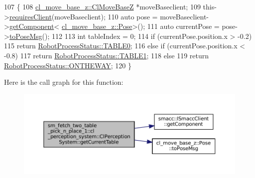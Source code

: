 \begin{DoxyCode}
107     \{
108         \hyperlink{classcl__move__base__z_1_1ClMoveBaseZ}{cl\_move\_base\_z::ClMoveBaseZ} *moveBaseclient;
109         this->\hyperlink{classsmacc_1_1ISmaccClient_a7a9990a2f3e35d547671188d69fee520}{requiresClient}(moveBaseclient);
110         \textcolor{keyword}{auto} pose = moveBaseclient->\hyperlink{classsmacc_1_1ISmaccClient_adef78db601749ca63c19e74a27cb88cc}{getComponent}<
      \hyperlink{classcl__move__base__z_1_1Pose}{cl\_move\_base\_z::Pose}>();
111         \textcolor{keyword}{auto} currentPose = pose->\hyperlink{classcl__move__base__z_1_1Pose_a9faf8c6b437ff6b19c8bddd692908dca}{toPoseMsg}();
112 
113         \textcolor{keywordtype}{int} tableIndex = 0;
114         \textcolor{keywordflow}{if} (currentPose.position.x > -0.2)
115             \textcolor{keywordflow}{return} \hyperlink{namespacesm__fetch__two__table__pick__n__place__1_1_1cl__perception__system_a8bbef1f1cfae124eaec70ac53eede699a1fd65c0ced0ead229bf6dd6a59067a4f}{RobotProcessStatus::TABLE0};
116         \textcolor{keywordflow}{else} \textcolor{keywordflow}{if} (currentPose.position.x < -0.8)
117             \textcolor{keywordflow}{return} \hyperlink{namespacesm__fetch__two__table__pick__n__place__1_1_1cl__perception__system_a8bbef1f1cfae124eaec70ac53eede699a5b22e42e5d94a94037a4486a4976c49d}{RobotProcessStatus::TABLE1};
118         \textcolor{keywordflow}{else}
119             \textcolor{keywordflow}{return} \hyperlink{namespacesm__fetch__two__table__pick__n__place__1_1_1cl__perception__system_a8bbef1f1cfae124eaec70ac53eede699a92f7ea3097b3fdb1b7a25669cfc1b8bd}{RobotProcessStatus::ONTHEWAY};
120     \}
\end{DoxyCode}
Here is the call graph for this function\+:
\nopagebreak
\begin{figure}[H]
\begin{center}
\leavevmode
\includegraphics[width=350pt]{classsm__fetch__two__table__pick__n__place__1_1_1cl__perception__system_1_1ClPerceptionSystem_ad9c1b82e644fdbfbfc2d808523a1f330_cgraph}
\end{center}
\end{figure}

